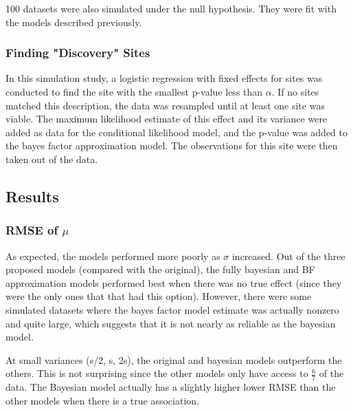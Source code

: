 \documentclass[AMA,STIX1COL]{WileyNJD-v2}\usepackage[]{graphicx}\usepackage[]{color}
\begin{document}
100 datasets were also simulated under the null hypothesis. They were fit with the models described previously. 

\subsubsection{Finding "Discovery" Sites}

In this simulation study, a logistic regression with fixed effects for sites was conducted to find the site with the smallest p-value less than $\alpha$. If no sites matched this description, the data was resampled until at least one site was viable. The maximum likelihood estimate of this effect and its variance were added as data for the conditional likelihood model, and the p-value was added to the bayes factor approximation model.  The observations for this site were then taken out of the data.

\subsection{Results}









\subsubsection{RMSE of $\mu$}

As expected, the models performed more poorly as $\sigma$ increased. Out of the three proposed models (compared with the original), the fully bayesian and BF approximation models performed best when there was no true effect (since they were the only ones that that had this option). However, there were some simulated datasets where the bayes factor model estimate was actually nonzero and quite large, which suggests that it is not nearly as reliable as the bayesian model.


At small variances (s/2, s,  2s), the original and bayesian models outperform the others. This is not surprising since the other models only have access to $\frac{6}{7}$ of the data. The Bayesian model actually has a slightly higher lower RMSE than the other models when there is a true association.
\end{document}
